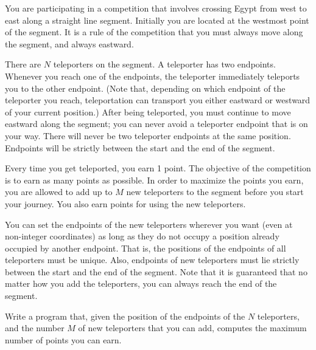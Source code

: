 You are participating in a competition that involves crossing Egypt from west to east along a straight line segment. Initially you are located at the westmost point of the segment. It is a rule of the competition that you must always move along the segment, and always eastward.

There are $N$ teleporters on the segment. A teleporter has two endpoints. Whenever you reach one of the endpoints, the teleporter immediately teleports you to the other endpoint. (Note that, depending on which endpoint of the teleporter you reach, teleportation can transport you either eastward or westward of your current position.) After being teleported, you must continue to move eastward along the segment; you can never avoid a teleporter endpoint that is on your way. There will never be two
teleporter endpoints at the same position. Endpoints will be strictly between the start and the end of the segment.

Every time you get teleported, you earn 1 point. The objective of the competition is to earn as many points as possible. In order to maximize the points you earn, you are allowed to add up to $M$ new teleporters to the segment before you start your journey. You also earn points for using the new teleporters.

You can set the endpoints of the new teleporters wherever you want (even at non-integer coordinates) as long as they do not occupy a position already occupied by another endpoint. That is, the positions of the endpoints of all teleporters must be unique. Also, endpoints of new teleporters must lie strictly between the start and the end of the segment. Note that it is guaranteed that no matter how you add the teleporters, you can always reach the end of the segment.

Write a program that, given the position of the endpoints of the $N$ teleporters, and the number $M$ of new teleporters that you can add, computes the maximum number of points you can earn.